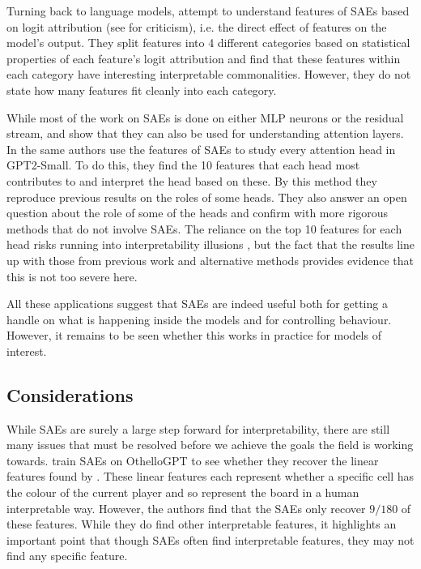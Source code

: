 Turning back to language models, \textcite{bloom_understanding_2024} attempt to understand features of SAEs based on logit attribution \parencite{nostalgebraist_interpreting_2020} (see \textcite{dao_adversarial_2023} for criticism), i.e. the direct effect of features on the model's output.
They split features into 4 different categories based on statistical properties of each feature's logit attribution and find that these features within each category have interesting interpretable commonalities.
However, they do not state how many features fit cleanly into each category.

While most of the work on SAEs is done on either MLP neurons or the residual stream, \textcite{kissane_sparse_2024} and \textcite{kissane_attention_2024} show that they can also be used for understanding attention layers.
In \textcite{krzyzanowski_we_2024} the same authors use the features of SAEs to study every attention head in GPT2-Small.
To do this, they find the 10 features that each head most contributes to and interpret the head based on these.
By this method they reproduce previous results on the roles of some heads.
They also answer an open question about the role of some of the heads and confirm with more rigorous methods that do not involve SAEs.
The reliance on the top 10 features for each head risks running into interpretability illusions \parencite{bolukbasi_interpretability_2021}, but the fact that the results line up with those from previous work and alternative methods provides evidence that this is not too severe here. 

All these applications suggest that SAEs are indeed useful both for getting a handle on what is happening inside the models and for controlling behaviour.
However, it remains to be seen whether this works in practice for models of interest.

\subsection{Considerations}
\label{sec:sae_considerations}
While SAEs are surely a large step forward for interpretability, there are still many issues that must be resolved before we achieve the goals the field is working towards.
\textcite{huben_research_2024} train SAEs on OthelloGPT \parencite{li_emergent_2023} to see whether they recover the linear features found by \textcite{neel_nanda_actually_2023}.
These linear features each represent whether a specific cell has the colour of the current player and so represent the board in a human interpretable way.
However, the authors find that the SAEs only recover $9/180$ of these features.
While they do find other interpretable features, it highlights an important point that though SAEs often find interpretable features, they may not find any specific feature.

